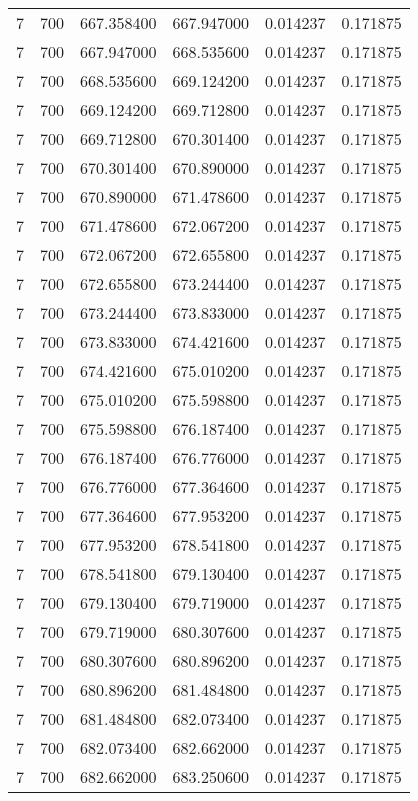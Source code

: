 \begin{longtable}{rrrrrr}
7 & 700 & 667.358400 & 667.947000 & 0.014237 & 0.171875 \\
7 & 700 & 667.947000 & 668.535600 & 0.014237 & 0.171875 \\
7 & 700 & 668.535600 & 669.124200 & 0.014237 & 0.171875 \\
7 & 700 & 669.124200 & 669.712800 & 0.014237 & 0.171875 \\
7 & 700 & 669.712800 & 670.301400 & 0.014237 & 0.171875 \\
7 & 700 & 670.301400 & 670.890000 & 0.014237 & 0.171875 \\
7 & 700 & 670.890000 & 671.478600 & 0.014237 & 0.171875 \\
7 & 700 & 671.478600 & 672.067200 & 0.014237 & 0.171875 \\
7 & 700 & 672.067200 & 672.655800 & 0.014237 & 0.171875 \\
7 & 700 & 672.655800 & 673.244400 & 0.014237 & 0.171875 \\
7 & 700 & 673.244400 & 673.833000 & 0.014237 & 0.171875 \\
7 & 700 & 673.833000 & 674.421600 & 0.014237 & 0.171875 \\
7 & 700 & 674.421600 & 675.010200 & 0.014237 & 0.171875 \\
7 & 700 & 675.010200 & 675.598800 & 0.014237 & 0.171875 \\
7 & 700 & 675.598800 & 676.187400 & 0.014237 & 0.171875 \\
7 & 700 & 676.187400 & 676.776000 & 0.014237 & 0.171875 \\
7 & 700 & 676.776000 & 677.364600 & 0.014237 & 0.171875 \\
7 & 700 & 677.364600 & 677.953200 & 0.014237 & 0.171875 \\
7 & 700 & 677.953200 & 678.541800 & 0.014237 & 0.171875 \\
7 & 700 & 678.541800 & 679.130400 & 0.014237 & 0.171875 \\
7 & 700 & 679.130400 & 679.719000 & 0.014237 & 0.171875 \\
7 & 700 & 679.719000 & 680.307600 & 0.014237 & 0.171875 \\
7 & 700 & 680.307600 & 680.896200 & 0.014237 & 0.171875 \\
7 & 700 & 680.896200 & 681.484800 & 0.014237 & 0.171875 \\
7 & 700 & 681.484800 & 682.073400 & 0.014237 & 0.171875 \\
7 & 700 & 682.073400 & 682.662000 & 0.014237 & 0.171875 \\
7 & 700 & 682.662000 & 683.250600 & 0.014237 & 0.171875 \\

\end{longtable}
